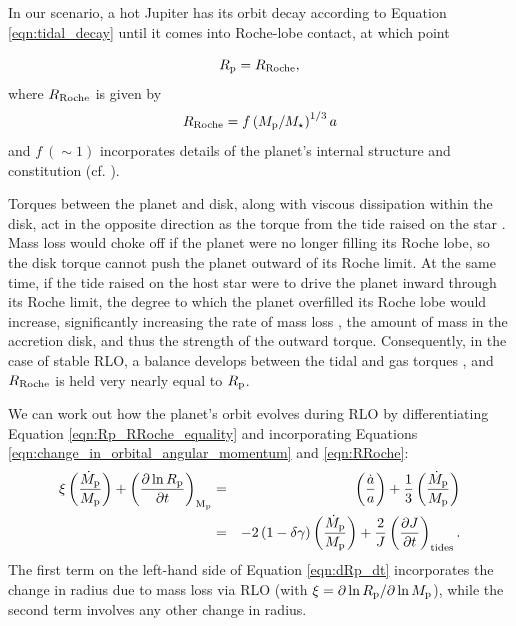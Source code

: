 \documentclass{svjour3}                     %
\begin{document}
In our scenario, a hot Jupiter has its orbit decay according to Equation \ref{eqn:tidal_decay} until it comes into Roche-lobe contact, at which point 

\begin{equation}
R_{\rm p} = R_{\rm Roche},
\label{eqn:Rp_RRoche_equality}
\end{equation}
where $R_{\rm Roche}$ is given by 
\begin{equation}
R_{\rm Roche} = f \left( M_{\rm p}/M_{\star} \right)^{1/3} a
\label{eqn:RRoche}
\end{equation}
and $f\ (\sim 1)$ incorporates details of the planet's internal structure and constitution (cf. \cite{MurrayDermott1999}). 

Torques between the planet and disk, along with viscous dissipation within the disk, act in the opposite direction as the torque from the tide raised on the star \cite{1979MNRAS.186..799L}. Mass loss would choke off if the planet were no longer filling its Roche lobe, so the disk torque cannot push the planet outward of its Roche limit. At the same time, if the tide raised on the host star were to drive the planet inward through its Roche limit, the degree to which the planet overfilled its Roche lobe would increase, significantly increasing the rate of mass loss \cite{Ritter1988Turning}, the amount of mass in the accretion disk, and thus the strength of the outward torque. Consequently, in the case of stable RLO, a balance develops between the tidal and gas torques \cite{Priedhorsky1988Tidal}, and $R_{\rm Roche}$ is held very nearly equal to $R_{\rm p}$. 

We can work out how the planet's orbit evolves during RLO by differentiating Equation \ref{eqn:Rp_RRoche_equality} and incorporating Equations \ref{eqn:change_in_orbital_angular_momentum} and \ref{eqn:RRoche}:
\begin{eqnarray}
\xi \left( \frac{\dot{M}_{\rm p}}{M_{\rm p}} \right) + \left( \frac{\partial \ln R_{\rm p}}{\partial t} \right)_{\rm M_{\rm p}} & = & \left( \frac{\dot{a}}{a} \right) + \frac{1}{3} \left( \frac{\dot{M}_{\rm p}}{M_{\rm p}} \right) \nonumber \\ 
& = & -2 \left(1 - \delta \gamma \right) \left( \frac{\dot{M}_{\rm p}}{M_{\rm p}}\right) + \frac{2}{J} \left( \frac{\partial J}{\partial t}\right)_{\rm tides}.
\label{eqn:dRp_dt}
\end{eqnarray}
The first term on the left-hand side of Equation \ref{eqn:dRp_dt} incorporates the change in radius due to mass loss via RLO (with $\xi = \partial \ln R_{\rm p}/\partial \ln M_{\rm p}$), while the second term involves any other change in radius.  
\end{document}
